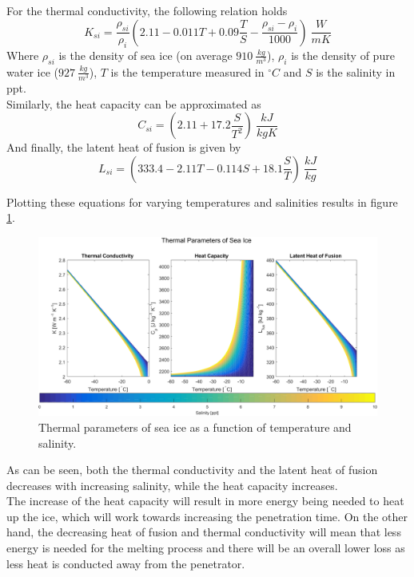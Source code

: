 \noindent
For the thermal conductivity, the following relation holds
\begin{equation}
K_{si}=\frac{\rho_{si}}{\rho_i}\left(2.11 - 0.011 T + 0.09 \frac{T}{S} - \frac{\rho_{si}-\rho_i}{1000}\right)\SI{}{\frac{W}{m K}}
\end{equation}
Where $\rho_{si}$ is the density of sea ice (on average $\SI{910}{\frac{kg}{m^3}}$\cite{article:timco19961}), $\rho_i$ is the density of pure water ice ($\SI{927}{\frac{kg}{m^3}}$), $T$ is the temperature measured in $^\circ C$ and $S$ is the salinity in ppt.\\
Similarly, the heat capacity can be approximated as
\begin{equation}
C_{si} = \left(2.11 + 17.2 \frac{S}{T^2}\right)\SI{}{\frac{kJ}{kg K}}
\end{equation}
And finally, the latent heat of fusion is given by
\begin{equation}
L_{si}=\left(333.4-2.11T-0.114S+18.1\frac{S}{T}\right)\SI{}{\frac{kJ}{kg}}
\end{equation}

\noindent
Plotting these equations for varying temperatures and salinities results in figure \ref{fig:iceSalinity}.
\begin{figure}[ht]
	\centering
	\includegraphics[width=.9\textwidth]{figures/LAMC/salinity}
	\caption{Thermal parameters of sea ice as a function of temperature and salinity.}
	\label{fig:iceSalinity}
\end{figure}
As can be seen, both the thermal conductivity and the latent heat of fusion decreases with increasing salinity, while the heat capacity increases. \\

\noindent
The increase of the heat capacity will result in more energy being needed to heat up the ice, which will work towards increasing the penetration time. On the other hand, the decreasing heat of fusion and thermal conductivity will mean that less energy is needed for the melting process and there will be an overall lower loss as less heat is conducted away from the penetrator.\\

